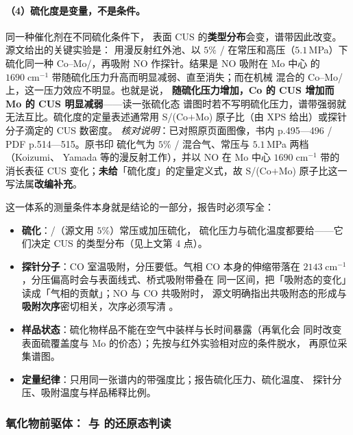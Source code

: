 \paragraph{（4）硫化度是变量，不是条件。}同一种催化剂在不同硫化条件下，
表面 CUS 的\textbf{类型分布}会变，谱带因此改变。源文给出的关键实验是：
用漫反射红外池、以 $5\%$ / 在常压和高压（$5.1$\,MPa）下
硫化同一种 Co--Mo/，再吸附 NO 作探针。结果是 NO 吸附在 Mo 中心
的 $1690\;\mathrm{cm^{-1}}$ 带随硫化压力升高而明显减弱、直至消失；而在机械
混合的 Co--Mo/ 上，这一压力效应不明显。也就是说，
\textbf{随硫化压力增加，Co 的 CUS 增加而 Mo 的 CUS 明显减弱}——读一张硫化态
谱图时若不写明硫化压力，谱带强弱就无法互比。硫化度的定量表述通常用
S/(Co$+$Mo) 原子比（由 XPS 给出）或探针分子滴定的 CUS 数密度。
\emph{核对说明}：已对照原页面图像，书内 p.495—496 / PDF p.514—515。原书印
硫化气为 $5\%$ / 混合气、常压与 $5.1$\,MPa 两档（Koizumi、
Yamada 等的漫反射工作），并以 NO 在 Mo 中心 $1690\;\mathrm{cm^{-1}}$ 带的
消长表征 CUS 变化；\textbf{未给}「硫化度」的定量定义式，故 S/(Co$+$Mo)
原子比这一写法属\textbf{改编补充}。

\begin{measure}
这一体系的测量条件本身就是结论的一部分，报告时必须写全：
\begin{itemize}
  \item \textbf{硫化}：/（源文用 $5\%$）常压或加压硫化，
        硫化压力与硫化温度都要给——它们决定 CUS 的类型分布（见上文第 4 点）。
  \item \textbf{探针分子}：CO 室温吸附，分压要低。气相 CO 本身的伸缩带落在
        $2143\;\mathrm{cm^{-1}}$，分压偏高时会与表面线式、桥式吸附带叠在
        同一区间，把「吸附态的变化」读成「气相的贡献」；NO 与 CO 共吸附时，
        源文明确指出共吸附态的形成与\textbf{吸附次序}密切相关，次序必须写清
        。
  \item \textbf{样品状态}：硫化物样品不能在空气中装样与长时间暴露（再氧化会
        同时改变表面硫覆盖度与 Mo 的价态）；先按与红外实验相对应的条件脱水，
        再原位采集谱图。
  \item \textbf{定量纪律}：只用同一张谱内的带强度比；报告硫化压力、硫化温度、
        探针分压、吸附温度与样品稀释比例。
\end{itemize}
\end{measure}

\subsubsection{氧化物前驱体： 与  的还原态判读}

